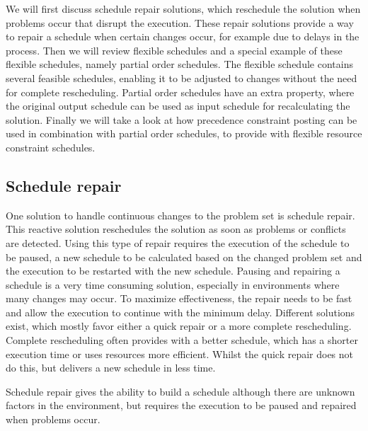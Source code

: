 \documentclass{article}
\begin{document}
We will first discuss schedule repair solutions, which reschedule the solution when problems occur that disrupt the execution.
These repair solutions provide a way to repair a schedule when certain changes occur, for example due to delays in the process.
Then we will review flexible schedules and a special example of these flexible schedules, namely partial order schedules.
The flexible schedule contains several feasible schedules, enabling it to be adjusted to changes without the need for complete rescheduling.
Partial order schedules have an extra property, where the original output schedule can be used as input schedule for recalculating the solution.
Finally we will take a look at how precedence constraint posting can be used in combination with partial order schedules, to provide with flexible resource constraint schedules.

\subsection{Schedule repair}
One solution to handle continuous changes to the problem set is schedule repair.
This reactive solution reschedules the solution as soon as problems or conflicts are detected.
Using this type of repair requires the execution of the schedule to be paused, a new schedule to be calculated based on the changed problem set and the execution to be restarted with the new schedule.
Pausing and repairing a schedule is a very time consuming solution, especially in environments where many changes may occur.
To maximize effectiveness, the repair needs to be fast and allow the execution to continue with the minimum delay.
Different solutions exist, which mostly favor either a quick repair or a more complete rescheduling.
\cite{policella07}
Complete rescheduling often provides with a better schedule, which has a shorter execution time or uses resources more efficient.
Whilst the quick repair does not do this, but delivers a new schedule in less time.

Schedule repair gives the ability to build a schedule although there are unknown factors in the environment, but requires the execution to be paused and repaired when problems occur.
\end{document}
